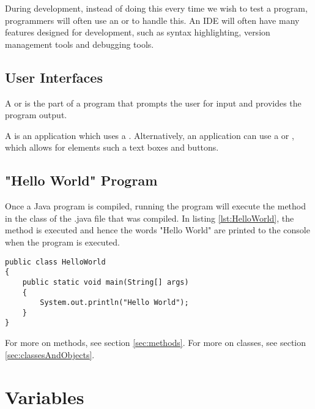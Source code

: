 \documentclass[11pt]{article}
\begin{document}
\par During development, instead of doing this every time we wish to test a program, programmers will often use an  or  to handle this. An IDE will often have many features designed for development, such as syntax highlighting, version management tools and debugging tools.

\subsection{User Interfaces}
\begin{defi}
    A  or  is the part of a program that prompts the user for input and provides the program output. 
\end{defi}
 A  is an application which uses a . Alternatively, an application can use a  or , which allows for elements such a text boxes and buttons.

\subsection{"Hello World" Program}
Once a Java program is compiled, running the program will execute the method in the class of the .java file that was compiled. In listing \ref{lst:HelloWorld}, the  method is executed and hence the words "Hello World" are printed to the console when the program is executed.
\begin{lstlisting}[caption=Hello World, label=lst:HelloWorld]
public class HelloWorld
{
    public static void main(String[] args)
    {
        System.out.println("Hello World");
    }
}
\end{lstlisting}
For more on methods, see section \ref{sec:methods}. For more on classes, see section \ref{sec:classesAndObjects}.

\pagebreak
\section{Variables}
\end{document}
